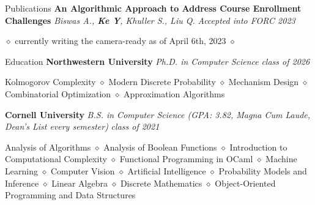\documentclass{resume} %
\date{\specialdate\today}
\begin{document}




\begin{rSection}{Publications}
{\bf An Algorithmic Approach to Address Course Enrollment
Challenges} \textit{Biswas A., \textbf{Ke Y}, Khuller S., Liu Q.}  \hfill {\em Accepted into FORC 2023}
\item $\diamond$  currently writing the camera-ready as of April 6th, 2023 $\diamond$
\end{rSection}

\begin{rSection}{Education}
{\bf Northwestern University} \textit{Ph.D. in Computer Science}  \hfill {\em class of 2026}
\item Kolmogorov Complexity  $\diamond$ Modern Discrete Probability $\diamond$ Mechanism Design  $\diamond$ Combinatorial Optimization  $\diamond$ Approximation Algorithms

{\bf Cornell University} \textit{B.S. in Computer Science (GPA: 3.82, Magna Cum Laude, Dean's List every semester)}  \hfill {\em class of 2021}
\item Analysis of Algorithms  $\diamond$ Analysis of Boolean Functions $\diamond$ Introduction to Computational Complexity $\diamond$ Functional Programming in OCaml $\diamond$ Machine Learning $\diamond$ Computer Vision $\diamond$ Artificial Intelligence $\diamond$ Probability Models and Inference $\diamond$ Linear Algebra $\diamond$ Discrete Mathematics $\diamond$ Object-Oriented Programming and Data Structures

\end{rSection}



\end{document}
